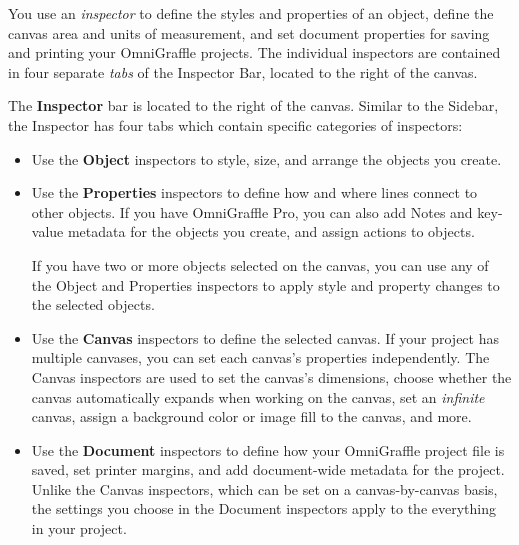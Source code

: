 \documentclass[../main.tex]{subfiles}
\begin{document}
\begin{description}[
      style=nextline,
    ]
  \item[Inspector] You use an \textit{inspector} to define the styles and properties of an
    object, define the
    canvas area and units of measurement, and set document properties for saving and printing
    your
    OmniGraffle projects.
    The individual inspectors are contained in four separate \textit{tabs} of the Inspector Bar,
    located to
    the right of the canvas.
  \item[Inspector Bar] The \textbf{Inspector} bar is located to the right of the canvas. Similar
    to the
    Sidebar, the Inspector has four tabs which contain specific categories of inspectors:
    \begin{itemize}[
          leftmargin=3em,
        ]
      \item Use the \textbf{Object} inspectors to style, size, and arrange the objects you
        create.
      \item Use the \textbf{Properties} inspectors to define how and where lines connect to
        other objects. If
        you have OmniGraffle Pro, you can also add Notes and key-value metadata for the objects
        you create,
        and assign actions to objects.

        \begin{ogtip}
          If you have two or more objects selected on the canvas, you can use any of the Object
          and
          Properties inspectors to apply style and property changes to the selected objects.

        \end{ogtip}

      \item Use the \textbf{Canvas} inspectors to define the selected canvas. If your project
        has multiple
        canvases, you can set each canvas's properties independently. The Canvas inspectors are
        used to set
        the canvas's dimensions, choose whether the canvas automatically expands when working on
        the canvas,
        set an \textit{infinite} canvas, assign a background color or image fill to the canvas,
        and more.
      \item Use the \textbf{Document} inspectors to define how your OmniGraffle project file is
        saved, set
        printer margins, and add document-wide metadata for the project. Unlike the Canvas
        inspectors, which
        can be set on a canvas-by-canvas basis, the settings you choose in the Document
        inspectors apply to
        the everything in your project.
    \end{itemize}


\end{description}
\end{document}

